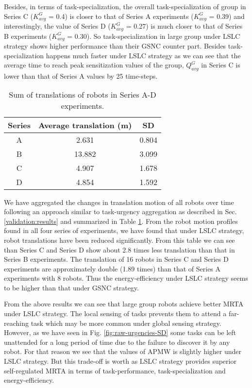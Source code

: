 \documentclass{intech}
\begin{document}
Besides, in terms of task-specialization, the overall task-specialization of group in Series C ($K^G_{avg}$ = 0.4) is  closer to that of Series A experiments ($K^G_{avg}$ = 0.39) and interestingly, the value of  Series D ($K^G_{avg}$ = 0.27) is  much closer to that of Series B experiments ($K^G_{avg}$ = 0.30). So task-specialization in large group under LSLC strategy shows higher performance than their GSNC counter part. Besides task-specialization happens much faster under LSLC strategy as we can see that the average time to reach peak sensitization values  of the group,  $Q^G_{avg}$ in Series C is lower than that of Series A values by 25 time-steps.
\begin{table}
\begin{center}
\caption{Sum of translations of robots in Series A-D experiments.}
\begin{tabular}{|c|c|c|}
\hline \textbf{Series} & \textbf{Average translation (m)} & \textbf{SD} \\ 
\hline A & 2.631 & 0.804\\ 
\hline B & 13.882 & 3.099\\
\hline C & 4.907 & 1.678\\
\hline D & 4.854 & 1.592\\
\hline
\end{tabular}
\label{table:motion-cmp} 
\end{center}
\end{table}
We have aggregated the changes in translation motion of all robots over time following an approach similar to task-urgency aggregation as described in Sec. \ref{validation:results} and summarized in Table \ref{table:motion-cmp}. From the robot motion profiles found in all four series of experiments, we have found that under LSLC strategy, robot translations have been reduced significantly. From this table we can see than Series C and Series D show about 2.8 times less translation than that in Series B experiments. The translation of 16 robots in Series C and Series D experiments are approximately double (1.89 times) than that of Series A experiments with 8 robots.  Thus the energy-efficiency under LSLC strategy seems to be higher  than that under GSNC strategy.

From the above results we can see that large group robots achieve better MRTA under LSLC strategy. The local sensing of tasks prevents them to attend a far-reaching task which may be more common under global sensing strategy. However, as we have seen in Fig. \ref{fig:raw-urgencies-SD}
some tasks can be left unattended for a long period of time due to the failure to discover it by any robot. For that reason we see that the values of APMW is slightly higher under LSLC strategy. But this trade-off is worth as LSLC strategy provides superior self-regulated MRTA in terms of task-performance, task-specialization and energy-efficiency.
\end{document}
